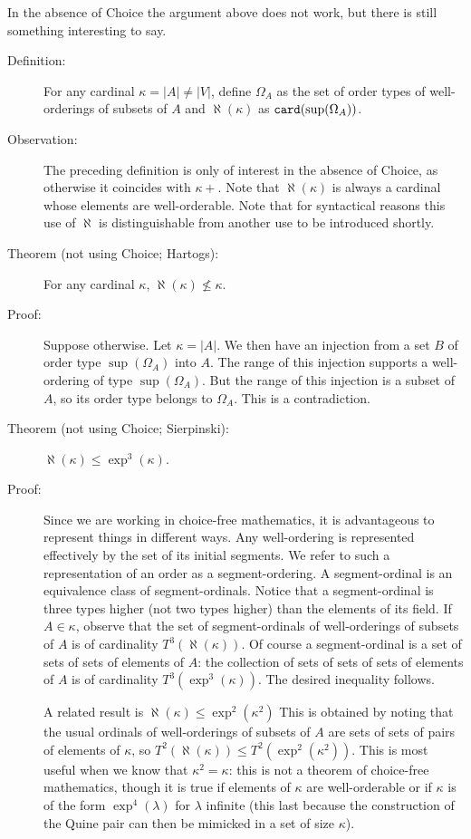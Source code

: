 \documentclass[12pt]{book}
\begin{document}
In the absence of Choice the argument above does not work, but there
is still something interesting to say.

\begin{description}

\item[Definition:] For any cardinal $\kappa = |A| \neq |V|$, define
$\Omega_A$ as the set of order types of well-orderings of subsets of
$A$ and $\aleph(\kappa)$ as ${\tt card}(\sup(\Omega_A))$.

\item[Observation:] The preceding definition is only of interest in
the absence of Choice, as otherwise it coincides with $\kappa+$.  Note
that $\aleph(\kappa)$ is always a cardinal whose elements are
well-orderable.  Note that for syntactical reasons this use of
$\aleph$ is distinguishable from another use to be introduced shortly.

\item[Theorem (not using Choice; Hartogs):] For any cardinal $\kappa$, $\aleph(\kappa)
\not\leq \kappa$.

\item[Proof:] Suppose otherwise.  Let $\kappa=|A|$.  We then have an
injection from a set $B$ of order type $\sup(\Omega_A)$ into $A$.  The
range of this injection supports a well-ordering of type
$\sup(\Omega_A)$.  But the range of this injection is a subset of $A$,
so its order type belongs to $\Omega_A$.  This is a contradiction.

\item[Theorem (not using Choice; Sierpinski):]  $\aleph(\kappa) \leq \exp^3(\kappa)$.

\item[Proof:] Since we are working in choice-free mathematics, it is
advantageous to represent things in different ways.  Any well-ordering
is represented effectively by the set of its initial segments.  We
refer to such a representation of an order as a segment-ordering.  A
segment-ordinal is an equivalence class of segment-ordinals.  Notice
that a segment-ordinal is three types higher (not two types higher)
than the elements of its field.  If $A \in \kappa$, observe that the
set of segment-ordinals of well-orderings of subsets of $A$ is of
cardinality $T^3(\aleph(\kappa))$.  Of course a segment-ordinal is a
set of sets of sets of elements of $A$: the collection of sets of sets
of sets of elements of $A$ is of cardinality $T^3(\exp^3(\kappa))$.
The desired inequality follows.

A related result is $\aleph(\kappa) \leq \exp^2(\kappa^2)$ This is
obtained by noting that the usual ordinals of well-orderings of
subsets of $A$ are sets of sets of pairs of elements of $\kappa$, so
$T^2(\aleph(\kappa)) \leq T^2(\exp^2(\kappa^2))$.  This is most useful
when we know that $\kappa^2=\kappa$: this is not a theorem of
choice-free mathematics, though it is true if elements of $\kappa$ are
well-orderable or if $\kappa$ is of the form $\exp^4(\lambda)$ for
$\lambda$ infinite (this last because the construction of the Quine
pair can then be mimicked in a set of size $\kappa$).

\end{description}
\end{document}
